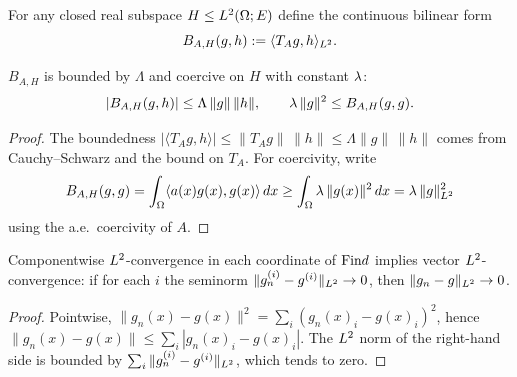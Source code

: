 \begin{definition}
\label{def:coeffBilinSubmodule}
\leanok
{}
For any closed real subspace $H \leq L^{2}(\Omega;E)$ define the continuous bilinear form
\begin{equation*}
  B_{A,H}(g,h) := \langle T_A g, h\rangle_{L^{2}}.
\end{equation*}
\end{definition}

\begin{lemma}
\label{lem:coeffBilinSubmodule_coercive}
\leanok
{}
$B_{A,H}$ is bounded by $\Lambda$ and coercive on $H$ with constant $\lambda$:
\begin{equation*}
  |B_{A,H}(g,h)| \leq \Lambda\,\|g\|\,\|h\|, \qquad \lambda\,\|g\|^{2} \leq B_{A,H}(g,g).
\end{equation*}
\end{lemma}

\begin{proof}
\leanok
{}

The boundedness $|\langle T_A g, h\rangle| \leq \|T_A g\|\,\|h\| \leq \Lambda \|g\|\,\|h\|$ comes from Cauchy--Schwarz and the bound on $T_A$. For coercivity, write
\begin{equation*}
  B_{A,H}(g,g) = \int_{\Omega}\langle a(x) g(x), g(x)\rangle\,dx \geq \int_{\Omega} \lambda\,\|g(x)\|^{2}\,dx = \lambda\,\|g\|_{L^{2}}^{2}
\end{equation*}
using the a.e.\ coercivity of $A$.
\end{proof}

\begin{lemma}
\label{lem:tendsto_eLpNorm_vector_of_componentwise}
\leanok
Componentwise $L^{2}$-convergence in each coordinate of $\mathrm{Fin} d$ implies vector $L^{2}$-convergence: if for each $i$ the seminorm $\|g_n^{(i)} - g^{(i)}\|_{L^{2}} \to 0$, then $\|g_n - g\|_{L^{2}} \to 0$.
\end{lemma}

\begin{proof}
\leanok

Pointwise, $\|g_n(x) - g(x)\|^{2} = \sum_i (g_n(x)_i - g(x)_i)^{2}$, hence $\|g_n(x) - g(x)\| \leq \sum_i |g_n(x)_i - g(x)_i|$. The $L^{2}$ norm of the right-hand side is bounded by $\sum_i \|g_n^{(i)} - g^{(i)}\|_{L^{2}}$, which tends to zero.
\end{proof}

